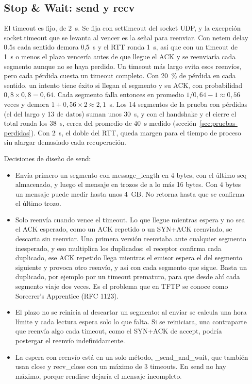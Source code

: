 \documentclass[
	spanish, %
	letterpaper, oneside
]{article}
\newcommand{\code}[1]{#1}     %
\newcommand{\flag}[1]{#1}     %
\newcommand{\field}[1]{#1}    %
\begin{document}
\subsection{Stop \& Wait: send y recv}
El timeout es fijo, de 2~s. Se fija con \code{settimeout} del socket UDP, y la excepción
\code{socket.timeout} que se levanta al vencer es la señal para reenviar. Con netem delay 0.5s
cada sentido demora 0,5~s y el RTT ronda 1~s, así que con un timeout de 1~s o menos el plazo
vencería antes de que llegue el \flag{ACK} y se reenviaría cada segmento aunque no se haya
perdido. Un timeout más largo evita esos reenvíos, pero cada pérdida cuesta un timeout completo.
Con 20~\% de pérdida en cada sentido, un intento tiene éxito si llegan el segmento y su
\flag{ACK}, con probabilidad $0{,}8 \times 0{,}8 = 0{,}64$. Cada segmento falla entonces en
promedio $1/0{,}64 - 1 \approx 0{,}56$ veces y demora $1 + 0{,}56 \times 2 \approx 2{,}1$~s. Los 14
segmentos de la prueba con pérdidas (el del largo y 13 de datos) suman unos 30~s, y con el
handshake y el cierre el total ronda los 38~s, cerca del promedio de 40~s medido
(sección~\ref{sec:pruebas-perdidas}). Con 2~s, el doble del RTT, queda margen para el tiempo de
proceso sin alargar demasiado cada recuperación.

Decisiones de diseño de \code{send}:
\begin{itemize}
	\item Envía primero un segmento con \field{message\_length} en 4 bytes, con el último
	\field{seq} almacenado, y luego el mensaje en trozos de a lo más 16 bytes. Con 4 bytes un
	mensaje puede medir hasta unos 4~GB. No retorna hasta que se confirma el último trozo.
	\item Solo reenvía cuando vence el timeout. Lo que llegue mientras espera y no sea el
	\flag{ACK} esperado, como un \flag{ACK} repetido o un \flag{SYN+ACK} reenviado, se descarta sin
	reenviar. Una primera versión reenviaba ante cualquier segmento inesperado, y eso multiplica los
	duplicados: el receptor confirma cada duplicado, ese \flag{ACK} repetido llega mientras el
	emisor espera el del segmento siguiente y provoca otro reenvío, y así con cada segmento que
	sigue. Basta un duplicado, por ejemplo por un timeout prematuro, para que desde ahí cada
	segmento viaje dos veces. Es el problema que en TFTP se conoce como Sorcerer's Apprentice
	(RFC 1123).
	\item El plazo no se reinicia al descartar un segmento: al enviar se calcula una hora límite y
	cada lectura espera solo lo que falta. Si se reiniciara, una contraparte que reenvía algo cada
	timeout, como el \flag{SYN+ACK} de \code{accept}, podría postergar el reenvío indefinidamente.
	\item La espera con reenvío está en un solo método, \code{\_send\_and\_wait}, que también usan
	\code{close} y \code{recv\_close} con un máximo de 3 timeouts. En \code{send} no hay máximo,
	porque rendirse dejaría el mensaje incompleto.
\end{itemize}
\end{document}
